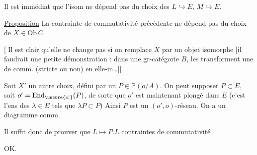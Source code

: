 Il est immédiat que   l'isom ne dépend pas du choix des  $L\hookrightarrow E$, $M\hookrightarrow E$.

\uline{Proposition} La contrainte de commutativité précédente ne dépend pas du choix de $X\in\mathrm{Ob}\,C$.

[ Il est clair qu'elle ne change pas si on remplace $X$ par un objet isomorphe [il faudrait une petite démonstration : dans une gr-catégorie $B$, les    transforment une   de comm. (stricte ou non) en elle-m\ldots ]]


 Soit $X'$ un autre choix, défini par un $P\in\mathbb P(o/A)$. On peut supposer $P\subset E$, soit $o'=\mathrm{End}_{\unsure{o|{}}}(P)$, de sorte que $o'$ est maintenant plongé dans $E$ (c'est l'ens des  $\lambda\in E$ tels que $\lambda P\subset P$) Ainsi $P$ est un  $(o',o)$-réseau. On a un diagramme comm.


Il suffit donc de prouver que $L\longmapsto P.L$     contraintes de commutativité


OK.

